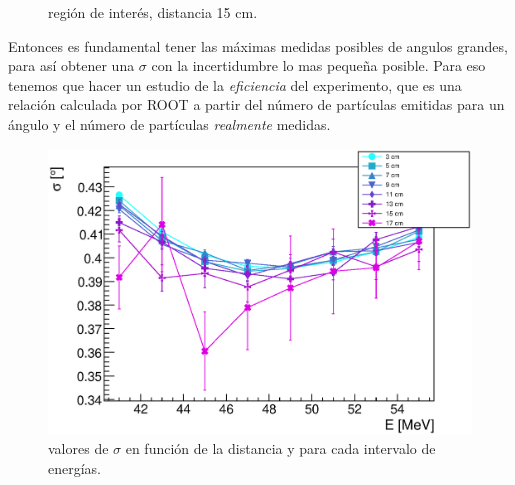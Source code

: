 \documentclass[12pt,a4paper]{article}
\numberwithin{equation}{section}
\numberwithin{figure}{section}
\begin{document}
\begin{figure}[h!]
    \caption{región de interés, distancia 15 cm.}
    \label{Fig:2.4-region_interes}
\end{figure}


Entonces es fundamental tener las máximas medidas posibles de angulos grandes, para así obtener una $\sigma$ con la incertidumbre lo mas pequeña posible. Para eso tenemos que hacer un estudio de la {\it eficiencia} del experimento, que es una relación calculada por ROOT a partir del número de partículas emitidas para un ángulo y el número de partículas {\it realmente} medidas. \\


\begin{figure}[h!] \centering
    \includegraphics[scale=0.8]{sigma.eps}
    \caption{valores de $\sigma$ en función de la distancia y para cada intervalo de energías.}
    \label{Fig:2.4-sigma}
\end{figure}
\end{document}
